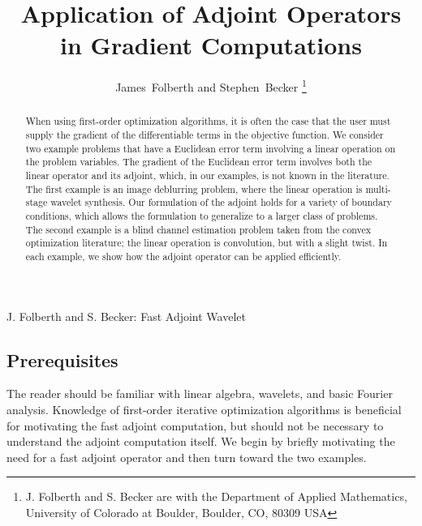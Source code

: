 \documentclass[journal]{IEEEtran}
\begin{document}
\title{Application of Adjoint Operators in Gradient Computations}
\author{James~Folberth and 
        Stephen~Becker%
\thanks{J. Folberth and S. Becker are with the Department
of Applied Mathematics, University of Colorado at Boulder,
Boulder, CO, 80309 USA}}

%
{J. Folberth and S. Becker: Fast Adjoint Wavelet}

\maketitle

\begin{abstract}
   When using first-order optimization algorithms, it is often the case that the user must supply the gradient of the differentiable terms in the objective function.  We consider two example problems that have a Euclidean error term involving a linear operation on the problem variables.  The gradient of the Euclidean error term involves both the linear operator and its adjoint, which, in our examples, is not known in the literature.  The first example is an image deblurring problem, where the linear operation is multi-stage wavelet synthesis.  Our formulation of the adjoint holds for a variety of boundary conditions, which allows the formulation to generalize to a larger class of problems.  The second example is a blind channel estimation problem taken from the convex optimization literature; the linear operation is convolution, but with a slight twist.  In each example, we show how the adjoint operator can be applied efficiently.
\end{abstract}

\subsection*{Prerequisites}
The reader should be familiar with linear algebra, wavelets, and basic Fourier analysis.  Knowledge of first-order iterative optimization algorithms is beneficial for motivating the fast adjoint computation, but should not be necessary to understand the adjoint computation itself.  We begin by briefly motivating the need for a fast adjoint operator and then turn toward the two examples.\\


\end{document}
